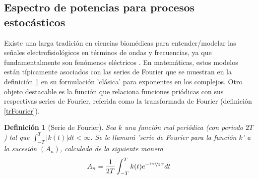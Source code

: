 \documentclass[12pt,a4paper]{mitthesis}
\newtheorem{defn}{Definici\'on}
\newcommand{\simint}[1]{\int_{- #1 }^{ #1 }}
\newcommand{\abso}[1]{\left| #1 \right|}
\begin{document}


\subsection{Espectro de potencias para procesos estoc\'asticos}

Existe una larga tradici\'on en ciencias biom\'edicas para entender/modelar las se\~nales
electrofisiol\'ogicos en t\'erminos de ondas y frecuencias, ya que fundamentalmente son
fen\'omenos el\'ectricos \cite{Kaiser00}. 
En matem\'aticas, estos modelos est\'an t\'ipicamente asociados con las series de Fourier
que se muestran en la definici\'on \ref{FourierClasico} en su formulaci\'on 'cl\'asica'
para exponentes en los complejos. Otro objeto destacable es la funci\'on que relaciona 
funciones pri\'odicas con sus respectivas series de Fourier, referida como la transformada de
Fourier (definici\'on \ref{trFourier}).

\begin{defn}[Serie de Fourier]
Sea $k$ una funci\'on real peri\'odica (con periodo $2T$) tal que 
$\simint{T} \abso{k(t)} dt < \infty$. 
Se le llamar\'a 'serie de Fourier para la funci\'on $k$' a la sucesi\'on
$\left( A_n \right)$, calculada de la siguiente manera
\begin{equation*}
A_n = \frac{1}{2 T} \simint{T} k(t) e^{-\nicefrac{ i n t}{2T}} dt
\end{equation*}
\label{FourierClasico}
\end{defn}
\end{document}
